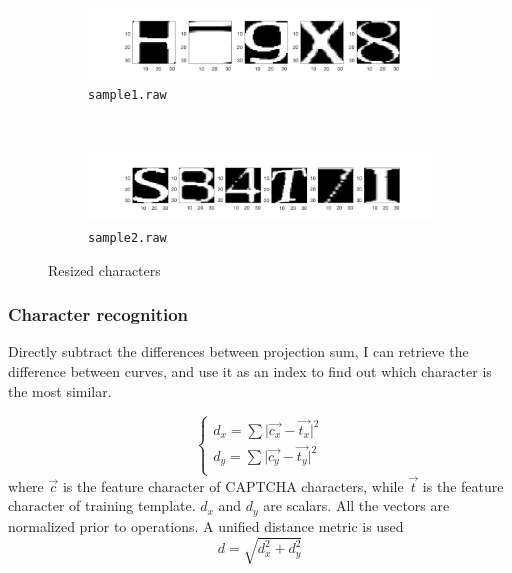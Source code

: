 \documentclass[12pt]{article}
\begin{document}
\begin{figure}[H]
    \centering
    \begin{subfigure}[t]{0.5\textwidth}
        \centering
        \includegraphics[width=\textwidth]{images/sample1_resized}
        \caption{{\tt sample1.raw}}
    \end{subfigure}%
    ~
    \begin{subfigure}[t]{0.5\textwidth}
        \centering
        \includegraphics[width=\textwidth]{images/sample2_resized}
        \caption{{\tt sample2.raw}}
    \end{subfigure}
    \caption{Resized characters}
\end{figure}

\subsubsection*{Character recognition}
Directly subtract the differences between projection sum, I can retrieve the difference between curves, and use it as an index to find out which character is the most similar.

\begin{equation}
\begin{cases}
	d_x = \sum \vert \vec{c_x} - \vec{t_x} \vert^2 \\
	d_y = \sum \vert \vec{c_y} - \vec{t_y} \vert^2 \\
\end{cases}	
\end{equation}
where $\vec{c}$ is the feature character of CAPTCHA characters, while $\vec{t}$ is the feature character of training template. $d_x$ and $d_y$ are scalars. All the vectors are normalized prior to operations. A unified distance metric is used 
 \begin{equation}
 	d = \sqrt{d_x^2 + d_y^2}
 \end{equation}
 
\end{document}

